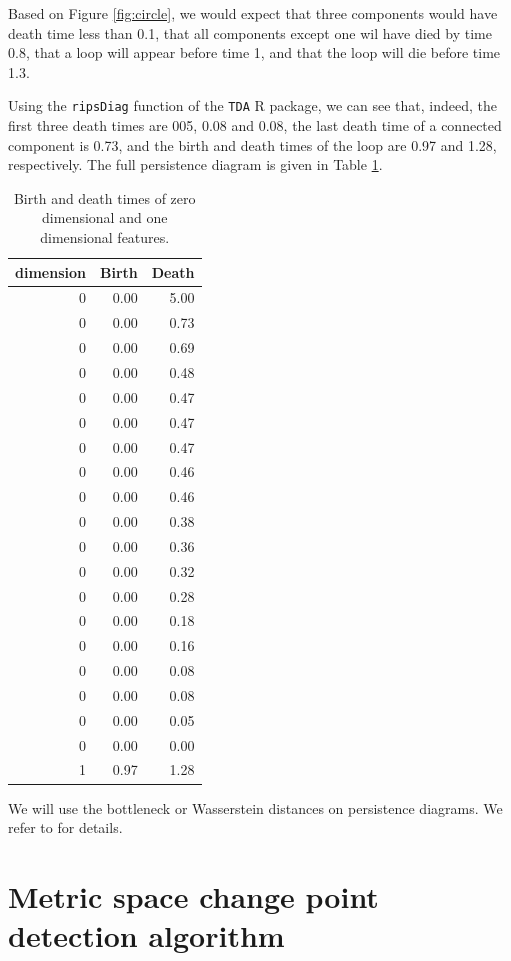 \documentclass[smallextended]{svjour3}       %
\begin{document}
Based on Figure \ref{fig:circle}, we would expect that three components would have death time less than 0.1, that all components except one wil have died by time 0.8, that a loop will appear before time 1, and that the loop will die before time 1.3. 

Using the \texttt{ripsDiag} function of the \texttt{TDA} R package, we can see that, indeed, the first three death times are 005, 0.08 and 0.08, the last death time of a connected component is 0.73, and the birth and death times of the loop are 0.97 and 1.28, respectively. The full persistence diagram is given in Table \ref{tab:circle}.

\begin{longtable}[t]{r|r|r}
\caption{\label{tab:circle}Birth and death times of zero dimensional and one dimensional features.}\\
\hline
dimension & Birth & Death\\
\hline
0 & 0.00 & 5.00\\
\hline
0 & 0.00 & 0.73\\
\hline
0 & 0.00 & 0.69\\
\hline
0 & 0.00 & 0.48\\
\hline
0 & 0.00 & 0.47\\
\hline
0 & 0.00 & 0.47\\
\hline
0 & 0.00 & 0.47\\
\hline
0 & 0.00 & 0.46\\
\hline
0 & 0.00 & 0.46\\
\hline
0 & 0.00 & 0.38\\
\hline
0 & 0.00 & 0.36\\
\hline
0 & 0.00 & 0.32\\
\hline
0 & 0.00 & 0.28\\
\hline
0 & 0.00 & 0.18\\
\hline
0 & 0.00 & 0.16\\
\hline
0 & 0.00 & 0.08\\
\hline
0 & 0.00 & 0.08\\
\hline
0 & 0.00 & 0.05\\
\hline
0 & 0.00 & 0.00\\
\hline
1 & 0.97 & 1.28\\
\hline
\end{longtable}

We will use the bottleneck or Wasserstein distances on persistence diagrams. We refer to \cite{??} for details.

\section{Metric space change point detection algorithm}\label{sec:1}
\end{document}
